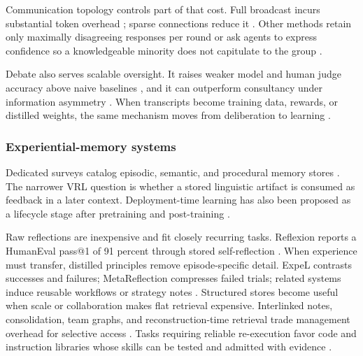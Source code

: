 Communication topology controls part of that cost. Full broadcast incurs substantial token overhead \citep{choi2026debate}; sparse connections reduce it \citep{li2024improving}. Other methods retain only maximally disagreeing responses per round \citep{nguyen2026hear} or ask agents to express confidence so a knowledgeable minority does not capitulate to the group \citep{lin2025enhancing}.

Debate also serves scalable oversight. It raises weaker model and human judge accuracy above naive baselines \citep{khan2024debating}, and it can outperform consultancy under information asymmetry \citep{kenton2024scalable}. When transcripts become training data, rewards, or distilled weights, the same mechanism moves from deliberation to learning \citep{motwani2024malt,subramaniam2025multiagent,park2025maporl,yi2026latent}.

\subsubsection{Experiential-memory systems}
\label{supp:subsec:deliberative-memory}

Dedicated surveys catalog episodic, semantic, and procedural memory stores \citep{zhang2025survey,du2026memory}. The narrower VRL question is whether a stored linguistic artifact is consumed as feedback in a later context. Deployment-time learning has also been proposed as a lifecycle stage after pretraining and post-training \citep{guo2026cascade}.

Raw reflections are inexpensive and fit closely recurring tasks. Reflexion reports a HumanEval pass@1 of 91 percent through stored self-reflection \citep{shinn2023reflexion}. When experience must transfer, distilled principles remove episode-specific detail. ExpeL contrasts successes and failures; MetaReflection compresses failed trials; related systems induce reusable workflows or strategy notes \citep{zhao2024expel,gupta2024metareflection,wang2024agent,ouyang2025reasoningbank,suzgun2026dynamic}. Structured stores become useful when scale or collaboration makes flat retrieval expensive. Interlinked notes, consolidation, team graphs, and reconstruction-time retrieval trade management overhead for selective access \citep{xu2025amem,chhikara2025mem0,zhang2025gmemory,ji2026memory}. Tasks requiring reliable re-execution favor code and instruction libraries whose skills can be tested and admitted with evidence \citep{wang2023voyager,fang2025memp,zhang2026agentfactory,lin2026museautoskill,zhou2026mementoskills,yang2026autoskill,liu2026skillsvote}.

